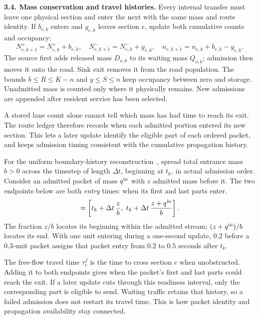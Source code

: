 \documentclass[10pt,a4paper]{article}
\begin{document}
\textbf{3.4. Mass conservation and travel histories.}
Every internal transfer must leave one physical section and enter the
next with the same mass and route identity. If $b_{e,k}$ enters and
$y_{e,k}$ leaves section $e$, update both cumulative counts and occupancy:
\begin{equation}
 N^+_{e,k+1}=N^+_{e,k}+b_{e,k},\quad
 N^-_{e,k+1}=N^-_{e,k}+y_{e,k},\quad
 n_{e,k+1}=n_{e,k}+b_{e,k}-y_{e,k}.
 \label{eq:compact-update}
\end{equation}
The source first adds released mass $D_{o,k}$ to its waiting mass $Q_{o,k}$;
admission then moves it onto the road. Sink exit removes it from the
road population. The bounds $b\leq R\leq K-n$ and $y\leq S\leq n$
keep occupancy between zero and storage. Unadmitted mass is counted
only where it physically remains. New admissions are appended after
resident service has been selected.


A stored lane count alone cannot tell which mass has had time to reach
its exit. The route ledger therefore records when each admitted portion
entered its new section. This lets a later update identify the eligible
part of each ordered packet, and keeps admission timing consistent with
the cumulative propagation history.

For the uniform boundary-history reconstruction~\cite{m1}, spread total
entrance mass $b>0$ across the timestep of length $\Delta t$, beginning at
$t_k$, in actual admission order. Consider an admitted packet of mass
$q^{\rm in}$ with $z$ admitted mass before it. The two endpoints below
are both \emph{entry} times: when its first and last parts enter.
\begin{equation}
 [t^{\rm in}_{\rm front},t^{\rm in}_{\rm tail}]
 =\left[t_k+\Delta t\,\frac z b,\
       t_k+\Delta t\,\frac{z+q^{\rm in}}b\right].
 \label{eq:compact-entry}
\end{equation}
The fraction $z/b$ locates its beginning within the admitted stream;
$(z+q^{\rm in})/b$ locates its end. With one unit entering during a
one-second update, $0.2$ before a $0.3$-unit packet assigns that packet
entry from $0.2$ to $0.5$ seconds after $t_k$.

The free-flow travel time $\tau^f_e$ is the time to cross section $e$
when unobstructed. Adding it to both endpoints gives when the packet's
first and last parts could reach the exit. If a later update cuts through
this readiness interval, only the corresponding part is eligible to send.
Waiting traffic retains that history, so a failed admission does not
restart its travel time. This is how packet identity and propagation
availability stay connected.
\par
\end{document}
